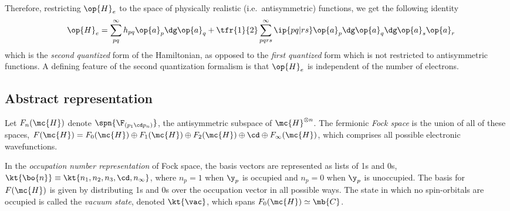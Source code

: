 \documentclass[11pt,fleqn]{article}
\numberwithin{equation}{section}
\begin{document}
\begin{rmk}
Therefore, restricting $\op{H}_e$ to the space of physically realistic (i.e.~antisymmetric) functions, we get the following identity
\begin{align}\label{second-quantized-hamiltonian}
&&
  \op{H}_e
=
  \sum_{pq}^\infty
  h_{pq}
  \op{a}_p\dg \op{a}_q
+
  \tfr{1}{2}
  \sum_{pqrs}^\infty
  \ip{pq|rs}
  \op{a}_p\dg\op{a}_q\dg\op{a}_s\op{a}_r
\end{align}
which is the \textit{second quantized} form of the Hamiltonian, as opposed to the \textit{first quantized} form which is not restricted to antisymmetric functions.
A defining feature of the second quantization formalism is that $\op{H}_e$ is independent of the number of electrons.
\end{rmk}

\subsection{Abstract representation}

\begin{dfn}\label{fock-space}
Let $F_n(\mc{H})$ denote $\spn\{\F_{(p_1\cd p_n)}\}$, the antisymmetric subspace of $\mc{H}^{\otimes n}$.
The fermionic \textit{Fock space} is the union of all of these spaces, $F(\mc{H})=F_0(\mc{H})\oplus F_1(\mc{H})\oplus F_2(\mc{H})\oplus\cd\oplus F_{\infty}(\mc{H})$, which comprises all possible electronic wavefunctions.
\end{dfn}

\begin{dfn}\label{occupation-number-representation}
In the \textit{occupation number representation} of Fock space, the basis vectors are represented as lists of 1s and 0s,
$
  \kt{\bo{n}}
\equiv
  \kt{n_1,n_2,n_3,\cd,n_\infty}
$,
where $n_p=1$ when $\y_p$ is occupied and $n_p=0$ when $\y_p$ is unoccupied.
The basis for $F(\mc{H})$ is given by distributing 1s and 0s over the occupation vector in all possible ways.
The state in which no spin-orbitals are occupied is called the \textit{vacuum state}, denoted $\kt{\vac}$, which spans $F_0(\mc{H})\simeq\mb{C}$.
\end{dfn}
\end{document}
